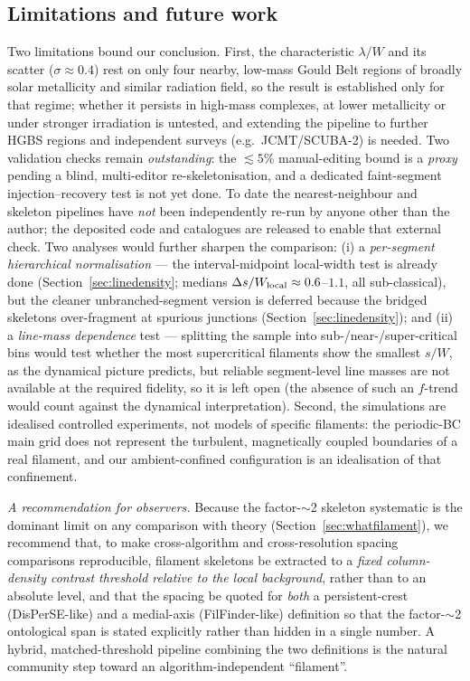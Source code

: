\documentclass[usenatbib,twoside,twocolumn]{mnras}
\begin{document}
\subsection{Limitations and future work}
\label{sec:limitations}

Two limitations bound our conclusion. First, the characteristic $\lambda/W$ and its scatter ($\sigma\approx0.4$) rest on only four nearby, low-mass Gould Belt regions of broadly solar metallicity and similar radiation field, so the result is established only for that regime; whether it persists in high-mass complexes, at lower metallicity or under stronger irradiation is untested, and extending the pipeline to further HGBS regions and independent surveys (e.g.\ JCMT/SCUBA-2) is needed. Two validation checks remain \emph{outstanding}: the $\lesssim5\%$ manual-editing bound is a \emph{proxy} pending a blind, multi-editor re-skeletonisation, and a dedicated faint-segment injection--recovery test is not yet done. To date the nearest-neighbour and skeleton pipelines have \emph{not} been independently re-run by anyone other than the author; the deposited code and catalogues are released to enable that external check. Two analyses would further sharpen the comparison: (i) a \emph{per-segment hierarchical normalisation} --- the interval-midpoint local-width test is already done (Section~\ref{sec:linedensity}; medians $\Delta s/W_{\rm local}\approx0.6$--$1.1$, all sub-classical), but the cleaner unbranched-segment version is deferred because the bridged skeletons over-fragment at spurious junctions (Section~\ref{sec:linedensity}); and (ii) a \emph{line-mass dependence} test --- splitting the sample into sub-/near-/super-critical bins would test whether the most supercritical filaments show the smallest $s/W$, as the dynamical picture predicts, but reliable segment-level line masses are not available at the required fidelity, so it is left open (the absence of such an $f$-trend would count against the dynamical interpretation). Second, the simulations are idealised controlled experiments, not models of specific filaments: the periodic-BC main grid does not represent the turbulent, magnetically coupled boundaries of a real filament, and our ambient-confined configuration is an idealisation of that confinement.

\smallskip\noindent\emph{A recommendation for observers.} Because the factor-$\sim$2 skeleton systematic is the dominant limit on any comparison with theory (Section~\ref{sec:whatfilament}), we recommend that, to make cross-algorithm and cross-resolution spacing comparisons reproducible, filament skeletons be extracted to a \emph{fixed column-density contrast threshold relative to the local background}, rather than to an absolute level, and that the spacing be quoted for \emph{both} a persistent-crest (DisPerSE-like) and a medial-axis (FilFinder-like) definition so that the factor-$\sim$2 ontological span is stated explicitly rather than hidden in a single number. A hybrid, matched-threshold pipeline combining the two definitions is the natural community step toward an algorithm-independent ``filament''.
\end{document}
